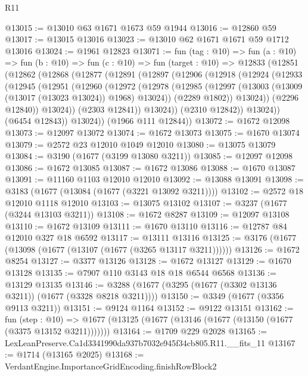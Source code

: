 \begin{lexlean}{R11}
\begin{coremodule}
@13015 := @13010 @63 @1671 @1673 @59 @1944
@13016 := @12860 @59
@13017 := @13015 @13016
@13023 := @13010 @62 @1671 @1671 @59 @1712 @13016
@13024 := @1961 @12823
@13071 := fun (tag : @10) =>
  fun (a : @10) =>
  fun (b : @10) =>
  fun (c : @10) =>
  fun (target : @10) =>
  @12833
    (@12851
      (@12862
        (@12868
          (@12877
            (@12891
              (@12897
                (@12906
                  (@12918
                    (@12924
                      (@12933
                        (@12945
                          (@12951
                            (@12960
                              (@12972
                                (@12978
                                  (@12985
                                    (@12997 (@13003 (@13009 (@13017 (@13023 @13024)) @1968) @13024))
                                    (@2289 @1802))
                                  @13024))
                              (@2296 @12840))
                            @13024))
                        (@2303 @12841))
                      @13024))
                  (@2310 @12842))
                @13024))
            (@6454 @12843))
          @13024))
      (@1966 @111 @12844))
@13072 := @1672 @12098
@13073 := @12097 @13072
@13074 := @1672 @13073
@13075 := @1670 @13074
@13079 := @2572 @23 @12010 @1049 @12010
@13080 := @13075 @13079
@13084 := @3190 (@1677 (@3199 @13080 @3211))
@13085 := @12097 @12098
@13086 := @1672 @13085
@13087 := @1672 @13086
@13088 := @1670 @13087
@13091 := @11160 @1103 @12010 @12010
@13092 := @13088 @13091
@13098 := @3183 (@1677 (@13084 (@1677 (@3221 @13092 @3211))))
@13102 := @2572 @18 @12010 @1118 @12010
@13103 := @13075 @13102
@13107 := @3237 (@1677 (@3244 @13103 @3211))
@13108 := @1672 @8287
@13109 := @12097 @13108
@13110 := @1672 @13109
@13111 := @1670 @13110
@13116 := @12787 @84 @12010 @327 @18 @6592
@13117 := @13111 @13116
@13125 := @3176 (@1677 (@13098 (@1677 (@13107 (@1677 (@3265 @13117 @3211))))))
@13126 := @1672 @8254
@13127 := @3377 @13126
@13128 := @1672 @13127
@13129 := @1670 @13128
@13135 := @7907 @110 @3143 @18 @18 @6544 @6568
@13136 := @13129 @13135
@13146 := @3288 (@1677 (@3295 (@1677 (@3302 @13136 @3211)) (@1677 (@3328 @8218 @3211))))
@13150 := @3349 (@1677 (@3356 @9113 @3211))
@13151 := @9124 @1164
@13152 := @9122 @13151
@13162 := fun (step : @10) =>
  @1677 (@13125 (@1677 (@13146 (@1677 (@13150 (@1677 (@3375 @13152 @3211)))))))
@13164 := @1709 @229 @2028
@13165 := LexLeanPreserve.Ca1d3341990da937b7032e945f34cb805.R11.__fits_11
@13167 := @1714 (@13165 @2025)
@13168 := VerdantEngine.ImportanceGridEncoding.finishRowBlock2

\end{coremodule}
\end{lexlean}
